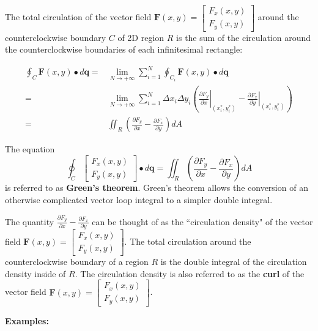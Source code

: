 \documentclass{article}
\begin{document}
The total circulation of the vector field \(\mathbf{F}(x, y) = \begin{bmatrix} F_x(x,y) \\ F_y(x,y) \end{bmatrix}\) around the counterclockwise boundary \(C\) of 2D region \(R\) is the sum of the circulation around the counterclockwise boundaries of each infinitesimal rectangle: 

\begin{align*}
\oint_C \mathbf{F}(x,y) \bullet d\mathbf{q} = & \lim_{N \rightarrow +\infty} \sum_{i = 1}^N \oint_{C_i} \mathbf{F}(x,y) \bullet d\mathbf{q} \\ 
= & \lim_{N \rightarrow +\infty} \sum_{i = 1}^N \Delta x_i \Delta y_i \left(\left.\frac{\partial F_y}{\partial x}\right|_{(x_i^*, y_i^*)} - \left.\frac{\partial F_x}{\partial y}\right|_{(x_i^*, y_i^*)}\right) \\ 
= & \iint_R \left(\frac{\partial F_y}{\partial x} - \frac{\partial F_x}{\partial y}\right)dA
\end{align*}

The equation 
\[\oint_C \begin{bmatrix} F_x(x,y) \\ F_y(x,y) \end{bmatrix} \bullet d\mathbf{q} = \iint_R \left(\frac{\partial F_y}{\partial x} - \frac{\partial F_x}{\partial y}\right)dA\]
is referred to as {\bf Green's theorem}. Green's theorem allows the conversion of an otherwise complicated vector loop integral to a simpler double integral.

The quantity \(\frac{\partial F_y}{\partial x} - \frac{\partial F_x}{\partial y}\) can be thought of as the ``circulation density" of the vector field \(\mathbf{F}(x,y) = \begin{bmatrix} F_x(x,y) \\ F_y(x,y) \end{bmatrix}\). The total circulation around the counterclockwise boundary of a region \(R\) is the double integral of the circulation density inside of \(R\). The circulation density is also referred to as the {\bf curl} of the vector field \(\mathbf{F}(x,y) = \begin{bmatrix} F_x(x,y) \\ F_y(x,y) \end{bmatrix}\). 

\vspace{5mm}

\textbf{Examples:}
\end{document}
